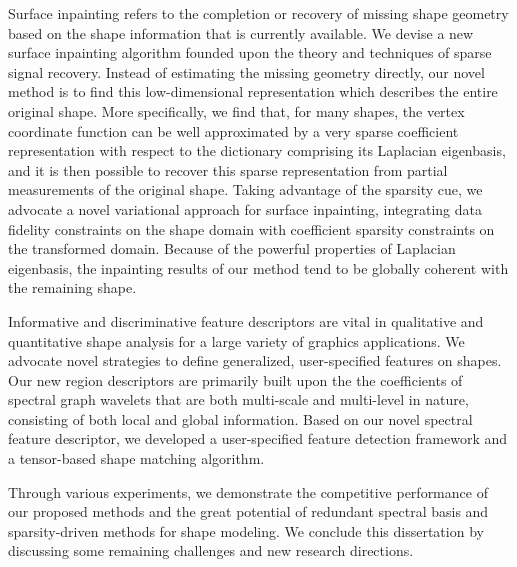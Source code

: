 \documentclass[12pt,letterpaper,twosided]{report}
\numberwithin{equation}{section}
\begin{document}
Surface inpainting refers to the completion or recovery of missing shape
geometry based on the shape information that is currently available. We
devise a new surface inpainting algorithm founded upon the theory and
techniques of sparse signal recovery. Instead of estimating the missing
geometry directly, our novel method is to find this low-dimensional
representation which describes the entire original shape. More specifically,
we find that, for many shapes, the vertex coordinate function can be well
approximated by a very sparse coefficient representation with respect to the
dictionary comprising its Laplacian eigenbasis, and it is then possible to
recover this sparse representation from partial measurements of the original
shape. Taking advantage of the sparsity cue, we advocate a novel variational
approach for surface inpainting, integrating data fidelity constraints on the
shape domain with coefficient sparsity constraints on the transformed domain.
Because of the powerful properties of Laplacian eigenbasis, the inpainting
results of our method tend to be globally coherent with the remaining shape.

Informative and discriminative feature descriptors are vital in qualitative and
quantitative shape analysis for a large variety of graphics applications. We
advocate novel strategies to define generalized, user-specified features on
shapes. Our new region descriptors are primarily built upon the the
coefficients of spectral graph wavelets that are both multi-scale and
multi-level in nature, consisting of both local and global information. Based
on our novel spectral feature descriptor, we developed a user-specified feature
detection framework and a tensor-based shape matching algorithm.

Through various experiments, we demonstrate the competitive performance of our
proposed methods and the great potential of redundant spectral basis and
sparsity-driven methods for shape modeling. We conclude this dissertation by
discussing some remaining challenges and new research directions.

\tableofcontents

\clearpage
{}
{}
\listoffigures

\clearpage
{}
{}
\listoftables


\end{document}
